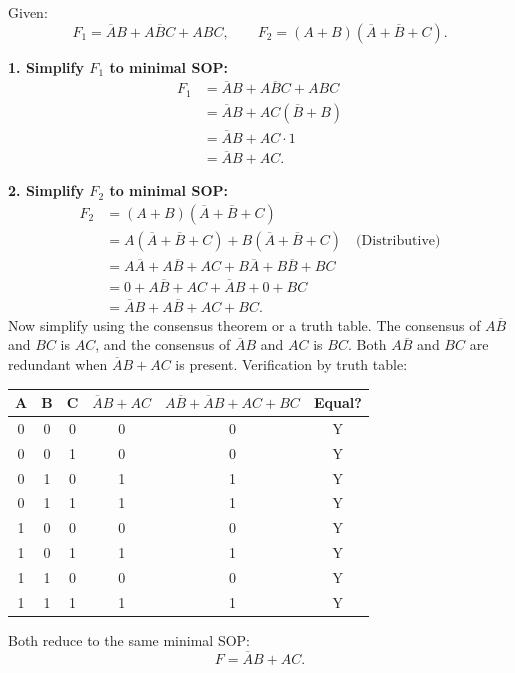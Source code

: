 \documentclass[11pt]{article}
\begin{document}
\begin{corrige}
Given:
\[
F_1 = \overline{A}B + A\overline{B}C + ABC, \qquad
F_2 = (A + B)(\overline{A} + \overline{B} + C).
\]

\textbf{1. Simplify \(F_1\) to minimal SOP:}
\[
\begin{aligned}
F_1 &= \overline{A}B + A\overline{B}C + ABC \\
&= \overline{A}B + AC(\overline{B} + B) \\
&= \overline{A}B + AC \cdot 1 \\
&= \overline{A}B + AC.
\end{aligned}
\]

\textbf{2. Simplify \(F_2\) to minimal SOP:}
\[
\begin{aligned}
F_2 &= (A + B)(\overline{A} + \overline{B} + C) \\
&= A(\overline{A} + \overline{B} + C) + B(\overline{A} + \overline{B} + C) \quad \text{(Distributive)} \\
&= A\overline{A} + A\overline{B} + AC + B\overline{A} + B\overline{B} + BC \\
&= 0 + A\overline{B} + AC + \overline{A}B + 0 + BC \\
&= \overline{A}B + A\overline{B} + AC + BC.
\end{aligned}
\]
Now simplify using the consensus theorem or a truth table. The consensus of \(A\overline{B}\) and \(BC\) is \(AC\), and the consensus of \(\overline{A}B\) and \(AC\) is \(BC\). Both \(A\overline{B}\) and \(BC\) are redundant when \(\overline{A}B + AC\) is present. Verification by truth table:

\begin{center}
\begin{tabular}{|c|c|c|c|c|c|}
\hline
A & B & C & \(\overline{A}B+AC\) & \(A\overline{B}+\overline{A}B+AC+BC\) & Equal? \\
\hline
0 & 0 & 0 & 0 & 0 & Y \\
0 & 0 & 1 & 0 & 0 & Y \\
0 & 1 & 0 & 1 & 1 & Y \\
0 & 1 & 1 & 1 & 1 & Y \\
1 & 0 & 0 & 0 & 0 & Y \\
1 & 0 & 1 & 1 & 1 & Y \\
1 & 1 & 0 & 0 & 0 & Y \\
1 & 1 & 1 & 1 & 1 & Y \\
\hline
\end{tabular}
\end{center}
Both reduce to the same minimal SOP:
\[
F = \overline{A}B + AC.
\]


\end{corrige}
\end{document}
